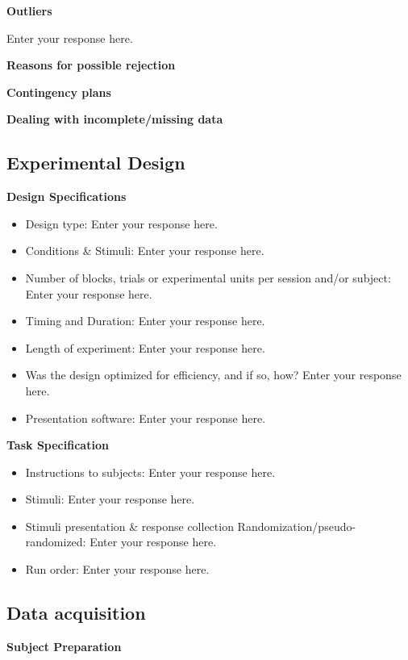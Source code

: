 \documentclass[]{article}
\begin{document}
\textbf{Outliers}

Enter your response here.

\textbf{Reasons for possible rejection}

\textbf{Contingency plans}

\textbf{Dealing with incomplete/missing data}

\hypertarget{experimental-design}{%
\subsection{Experimental Design}\label{experimental-design}}

\textbf{Design Specifications}

\begin{itemize}
\item
  Design type: Enter your response here.
\item
  Conditions \& Stimuli: Enter your response here.
\item
  Number of blocks, trials or experimental units per session and/or
  subject: Enter your response here.
\item
  Timing and Duration: Enter your response here.
\item
  Length of experiment: Enter your response here.
\item
  Was the design optimized for efficiency, and if so, how? Enter your
  response here.
\item
  Presentation software: Enter your response here.
\end{itemize}

\textbf{Task Specification}

\begin{itemize}
\item
  Instructions to subjects: Enter your response here.
\item
  Stimuli: Enter your response here.
\item
  Stimuli presentation \& response collection
  Randomization/pseudo-randomized: Enter your response here.
\item
  Run order: Enter your response here.
\end{itemize}

\hypertarget{data-acquisition}{%
\subsection{Data acquisition}\label{data-acquisition}}

\textbf{Subject Preparation}
\end{document}
